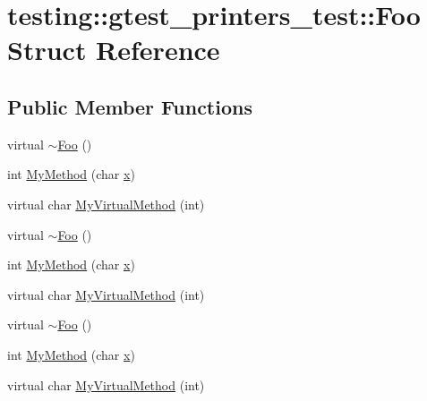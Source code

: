 \hypertarget{structtesting_1_1gtest__printers__test_1_1_foo}{}\section{testing\+::gtest\+\_\+printers\+\_\+test\+::Foo Struct Reference}
\label{structtesting_1_1gtest__printers__test_1_1_foo}
\subsection*{Public Member Functions}
\begin{DoxyCompactItemize}
\item 
virtual \mbox{\hyperlink{structtesting_1_1gtest__printers__test_1_1_foo_a3797cc88591e06b40208ea7535cf33f6}{$\sim$\+Foo}} ()
\item 
int \mbox{\hyperlink{structtesting_1_1gtest__printers__test_1_1_foo_a703c1159114f3a640b16d470a9613672}{My\+Method}} (char \mbox{\hyperlink{_obj__test_2lib_2googletest-master_2googlemock_2test_2gmock-matchers__test_8cc_a6150e0515f7202e2fb518f7206ed97dc}{x}})
\item 
virtual char \mbox{\hyperlink{structtesting_1_1gtest__printers__test_1_1_foo_a368dc5150b27c2aaca6034830334e1cd}{My\+Virtual\+Method}} (int)
\item 
virtual \mbox{\hyperlink{structtesting_1_1gtest__printers__test_1_1_foo_a3797cc88591e06b40208ea7535cf33f6}{$\sim$\+Foo}} ()
\item 
int \mbox{\hyperlink{structtesting_1_1gtest__printers__test_1_1_foo_a703c1159114f3a640b16d470a9613672}{My\+Method}} (char \mbox{\hyperlink{_obj__test_2lib_2googletest-master_2googlemock_2test_2gmock-matchers__test_8cc_a6150e0515f7202e2fb518f7206ed97dc}{x}})
\item 
virtual char \mbox{\hyperlink{structtesting_1_1gtest__printers__test_1_1_foo_a368dc5150b27c2aaca6034830334e1cd}{My\+Virtual\+Method}} (int)
\item 
virtual \mbox{\hyperlink{structtesting_1_1gtest__printers__test_1_1_foo_a3797cc88591e06b40208ea7535cf33f6}{$\sim$\+Foo}} ()
\item 
int \mbox{\hyperlink{structtesting_1_1gtest__printers__test_1_1_foo_a703c1159114f3a640b16d470a9613672}{My\+Method}} (char \mbox{\hyperlink{_obj__test_2lib_2googletest-master_2googlemock_2test_2gmock-matchers__test_8cc_a6150e0515f7202e2fb518f7206ed97dc}{x}})
\item 
virtual char \mbox{\hyperlink{structtesting_1_1gtest__printers__test_1_1_foo_a368dc5150b27c2aaca6034830334e1cd}{My\+Virtual\+Method}} (int)
\end{DoxyCompactItemize}
